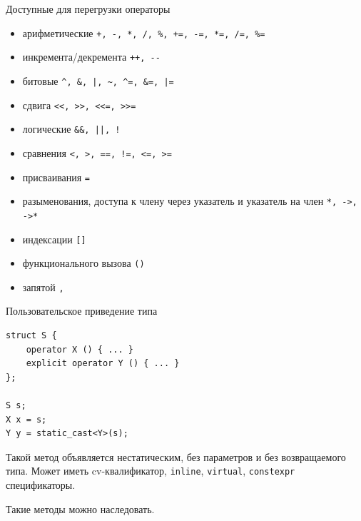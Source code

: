 \documentclass[unknownkeysallowed,xcolor=table]{beamer}
\begin{document}
\begin{frame}[fragile]{Доступные для перегрузки операторы}

\begin{itemize}
  \item арифметические \lstinline{+, -, *, /, %, +=, -=, *=, /=, %=}
  \item инкремента/декремента \lstinline{++, --}
  \item битовые \lstinline{^, &, |, ~, ^=, &=, |=}
  \item сдвига \lstinline{<<, >>, <<=, >>=}
  \item логические \lstinline{&&, ||, !}
  \item сравнения \lstinline{<, >, ==, !=, <=, >=}
  \item присваивания \lstinline{=}
  \item разыменования, доступа к члену через указатель и указатель на член \lstinline{*, ->, ->*}
  \item индексации \lstinline{[]}
  \item функционального вызова \lstinline{()}
  \item запятой \lstinline{,}
\end{itemize}

\end{frame}

\begin{frame}[fragile]{Пользовательское приведение типа}

\begin{lstlisting}
struct S {
    operator X () { ... }
    explicit operator Y () { ... }
};

S s;
X x = s;
Y y = static_cast<Y>(s);
\end{lstlisting}

\vspace{1em}

Такой метод объявляется нестатическим, без параметров и без возвращаемого типа. Может иметь cv-квалификатор, \lstinline{inline}, \lstinline{virtual}, \lstinline{constexpr} спецификаторы.

\vspace{1em}

Такие методы можно наследовать.

\end{frame}
\end{document}
